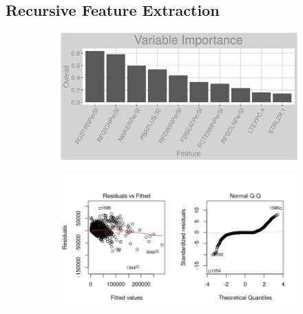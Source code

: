 \subsection{Recursive Feature Extraction}
\label{appendix:electricity:rfe}
\begin{figure}[h]
\centering
\begin{subfigure}{1\textwidth}
\centering
\includegraphics[width=.99\textwidth, height=0.3\textheight]{Images/electricity_rfe_vars.png}
\end{subfigure}
\begin{subfigure}{1\textwidth}
\centering
\includegraphics[width=.99\textwidth, height=0.475\textheight]{Images/electricity_rfe_res_1.png}
\end{subfigure}
\end{figure}
\FloatBarrier
\newpage
